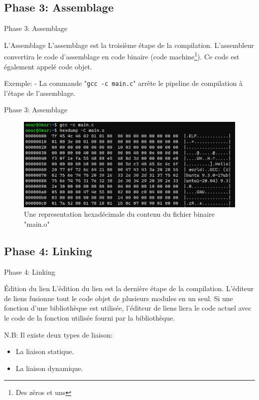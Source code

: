 \documentclass{beamer}
\begin{document}
\begin{darkframes}
  	\subsection{Phase 3: Assemblage}
  	\begin{frame}{Phase 3: Assemblage}
  		\begin{block}{L'Assemblage}
  			\alert{L'assemblage } est la troisième étape de la compilation. L'assembleur convertira le code d'assemblage en code binaire (code machine\footnote[frame]{Des zéros et uns}). Ce code est également appelé \alert{code objet}.
  		\end{block}
  		\begin{exampleblock}{Exemple:}
  			- La commande "\texttt{gcc -c main.c}" arrête le pipeline de compilation à l'étape de l'assemblage.\\
  		\end{exampleblock}
  	\end{frame}
	  \begin{frame}{Phase 3: Assemblage}
	  	\begin{figure}[b]
	  		\centering
	  		\includegraphics[scale=0.5]{resources/hello_world_o}
	  		\caption{Une representation hexadécimale du contenu du fichier binaire "main.o"}
	  	\end{figure}
	  \end{frame}
  	
	\subsection{Phase 4: Linking}
	\begin{frame}{Phase 4: Linking}
		\begin{block}{Édition du lien}
			\alert{L'édition du lien } est la dernière étape de la compilation. L'éditeur de liens \alert{fusionne } tout le code objet de plusieurs modules en un seul. \alert{Si} une fonction d'une bibliothèque est utilisée, l'éditeur de liens \alert{liera} le code actuel avec le code de la fonction utilisée \alert{fourni} par la bibliothèque.
		\end{block}
		\begin{alertblock}{N.B:}
			Il existe deux types de liaison:
			\begin{itemize}
				\item La \alert{liaison statique}.
				\item La \alert{liaison dynamique}.
			\end{itemize}
		\end{alertblock}
	\end{frame}


\end{darkframes}
\end{document}
